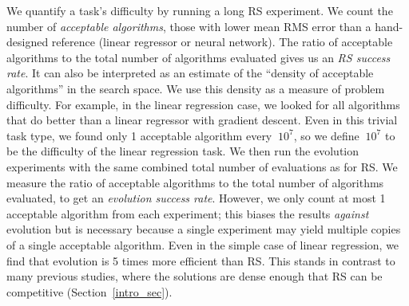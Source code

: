 
We quantify a task's difficulty by running a long RS experiment. We count the number of \textit{acceptable algorithms}, \ie those with lower mean RMS error than a hand-designed reference (\eg linear regressor or neural network). The ratio of acceptable algorithms to the total number of algorithms evaluated gives us an \textit{RS success rate}. It can also be interpreted as an estimate of the ``density of acceptable algorithms'' in the search space. We use this density as a measure of problem difficulty. For example, in the linear regression case, we looked for all algorithms that do better than a linear regressor with gradient descent. Even in this trivial task type, we found only 1 acceptable algorithm every $~10^{7}$, so we define $~10^{7}$ to be the difficulty of the linear regression task. We then run the evolution experiments with the same combined total number of evaluations as for RS. We measure the ratio of acceptable algorithms to the total number of algorithms evaluated, to get an \textit{evolution success rate}. However, we only count at most 1 acceptable algorithm from each experiment; this biases the results \emph{against} evolution but is necessary because a single experiment may yield multiple copies of a single acceptable algorithm. Even in the simple case of linear regression, we find that evolution is 5 times more efficient than RS. This stands in contrast to many previous \aml studies, where the solutions are dense enough that RS can be competitive (Section~\ref{intro_sec}).

